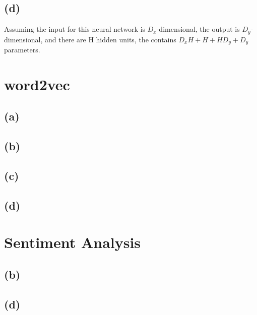 \documentclass{article}
\begin{document}
\subsection*{(d)}
Assuming the input for this neural network is $D_{x}$-dimensional, the output is $D_{y}$-dimensional, and there are H hidden units, the contains $D_{x}H + H + HD_{y} + D_{y}$ parameters.

\section{word2vec}
\subsection*{(a)}
\subsection*{(b)}
\subsection*{(c)}
\subsection*{(d)}

\section{Sentiment Analysis}
\subsection*{(b)}

\subsection*{(d)}
\end{document}
